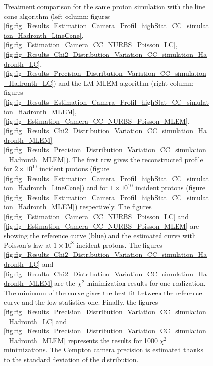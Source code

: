 \begin{figure} [!h]
\caption{Treatment comparison for the same proton simulation with the line cone algorithm (left column: figures \ref{fig:fig_Results_Estimation_Camera_Profil_highStat_CC_simulation_Hadronth_LineCone}, \ref{fig:fig_Estimation_Camera_CC_NURBS_Poisson_LC}, \ref{fig:fig_Results_Chi2_Distribution_Variation_CC_simulation_Hadronth_LC}, \ref{fig:fig_Results_Precision_Distribution_Variation_CC_simulation_Hadronth_LC}) and the LM-MLEM algorithm (right column: figures \ref{fig:fig_Results_Estimation_Camera_Profil_highStat_CC_simulation_Hadronth_MLEM}, \ref{fig:fig_Estimation_Camera_CC_NURBS_Poisson_MLEM}, \ref{fig:fig_Results_Chi2_Distribution_Variation_CC_simulation_Hadronth_MLEM}, \ref{fig:fig_Results_Precision_Distribution_Variation_CC_simulation_Hadronth_MLEM}). The first row gives the reconstructed profile for $2\times10^{10}$ incident protons (figure \ref{fig:fig_Results_Estimation_Camera_Profil_highStat_CC_simulation_Hadronth_LineCone}) and for $1\times10^{10}$ incident protons (figure \ref{fig:fig_Results_Estimation_Camera_Profil_highStat_CC_simulation_Hadronth_MLEM}) respectively. The figures \ref{fig:fig_Estimation_Camera_CC_NURBS_Poisson_LC} and \ref{fig:fig_Estimation_Camera_CC_NURBS_Poisson_MLEM} are showing the reference curve (blue) and the estimated curve with Poisson's law at $1\times10^8$ incident protons. The figures \ref{fig:fig_Results_Chi2_Distribution_Variation_CC_simulation_Hadronth_LC} and \ref{fig:fig_Results_Chi2_Distribution_Variation_CC_simulation_Hadronth_MLEM} are the $\chi^2$ minimization results for one realization. The minimum of the curve gives the best fit between the reference curve and the low statistics one. Finally, the figures  \ref{fig:fig_Results_Precision_Distribution_Variation_CC_simulation_Hadronth_LC} and \ref{fig:fig_Results_Precision_Distribution_Variation_CC_simulation_Hadronth_MLEM} represents the results for 1000 $\chi^2$ minimizations. The Compton camera precision is estimated thanks to the standard deviation of the distribution. }
\end{figure}

